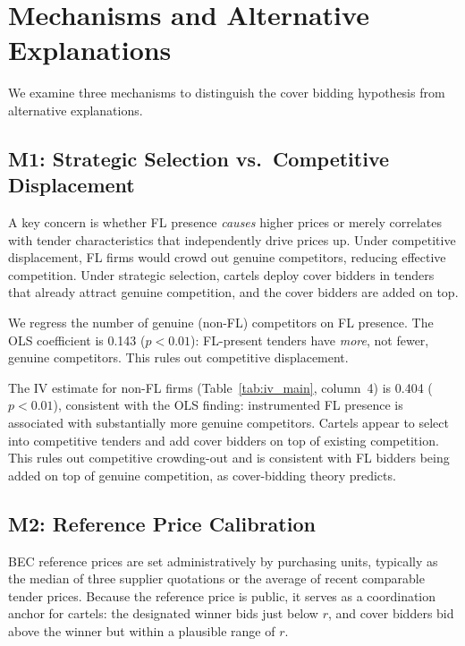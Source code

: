 \section{Mechanisms and Alternative Explanations}
\label{sec:mechanisms}

We examine three mechanisms to distinguish the cover bidding hypothesis
from alternative explanations.

\subsection{M1: Strategic Selection vs.\ Competitive Displacement}

A key concern is whether FL presence \emph{causes} higher prices or
merely correlates with tender characteristics that independently drive
prices up. Under competitive displacement, FL firms would crowd out
genuine competitors, reducing effective competition. Under strategic
selection, cartels deploy cover bidders in tenders that already attract
genuine competition, and the cover bidders are added on top.

We regress the number of genuine (non-FL) competitors on FL presence.
The OLS coefficient is 0.143 ($p < 0.01$): FL-present tenders have
\emph{more}, not fewer, genuine competitors. This rules out competitive
displacement.

The IV estimate for non-FL firms (Table~\ref{tab:iv_main}, column~4) is
0.404 ($p < 0.01$), consistent with the OLS finding: instrumented FL presence
is associated with substantially more genuine competitors. Cartels
appear to select into competitive tenders and add cover bidders on top
of existing competition. This rules out competitive crowding-out and is
consistent with FL bidders being added on top of genuine competition, as
cover-bidding theory predicts.

\subsection{M2: Reference Price Calibration}

BEC reference prices are set administratively by purchasing units, %
typically as the median of three supplier quotations or the average of
recent comparable tender prices. Because the reference price is public,
it serves as a coordination anchor for cartels: the designated winner
bids just below $r$, and cover bidders bid above the winner but within
a plausible range of $r$.

